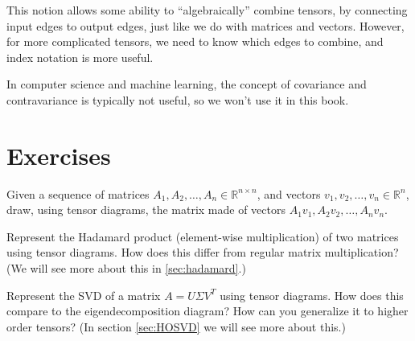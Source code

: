 This notion allows some ability to ``algebraically'' combine tensors, by connecting input edges to output edges, just like we do with matrices and vectors.
However, for more complicated tensors, we need to know which edges to combine, and index notation is more useful.

In computer science and machine learning, the concept of covariance and contravariance is typically not useful, so we won't use it in this book.

\section{Exercises}
\begin{exercise}
   Given a sequence of matrices $A_1, A_2, \ldots, A_n \in \mathbb R^{n\times n}$,
   and vectors $v_1, v_2, \ldots, v_n \in \mathbb R^n$,
   draw, using tensor diagrams, the matrix made of vectors $A_1v_1, A_2v_2, \ldots, A_nv_n$.
\end{exercise}
\begin{exercise}
Represent the Hadamard product (element-wise multiplication) of two matrices using tensor diagrams.
How does this differ from regular matrix multiplication?
(We will see more about this in \ref{sec:hadamard}.)
\end{exercise}
\begin{exercise}
Represent the SVD of a matrix $A = U\Sigma V^T$ using tensor diagrams.
How does this compare to the eigendecomposition diagram?
How can you generalize it to higher order tensors?
(In section \ref{sec:HOSVD} we will see more about this.)
\end{exercise}
